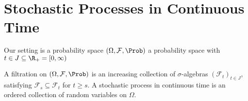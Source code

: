 \chapter{Stochastic Processes in Continuous Time}
\label{cha:stoch-proc-cont}

Our setting is a probability space $(\Omega, \mathcal{F}, \Prob)$ a
probability space with $t \in J \subseteq \R_{+} = [0, \infty)$

\begin{defn}
  \label{defn:continuous_time:1}
  A filtration on $(\Omega, \mathcal{F}, \Prob)$ is an increasing
  collection of $\sigma$-algebras $(\mathcal{F}_{t})_{t \in J}$,
  satisfying $\mathcal{F}_{s} \subseteq \mathcal{F}_{t}$ for $t \geq
  s$.  A stochastic process in continuous time is an ordered
  collection of random variables on $\Omega$.  
\end{defn}

